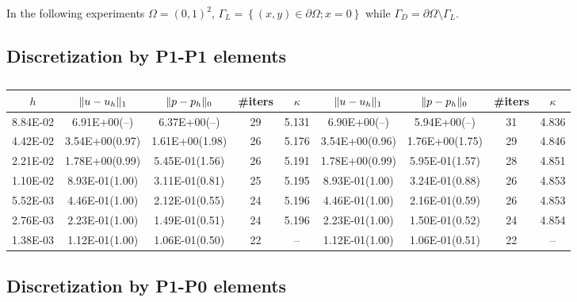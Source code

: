 \documentclass[r]{siamart171218}
\begin{document}
In the following experiments $\Omega=(0, 1)^2$, $\Gamma_L=\left\{(x, y)\in\partial\Omega; x=0\right\}$
while $\Gamma_D=\partial\Omega\setminus \Gamma_L$.

\subsection{Discretization by P1-P1 elements}\label{sec:p1_p1}

\begin{table}
  \begin{center}
    \footnotesize{
  \begin{tabular}{c|cc|c|c||cc|c|c}
    \hline
    $h$ & $\lVert{u-u_h}\rVert_1$ & $\lVert{p-p_h}\rVert_0$ & \#{iters} & $\kappa$
        & $\lVert{u-u_h}\rVert_1$ & $\lVert{p-p_h}\rVert_0$ & \#{iters} & $\kappa$ \\
    \hline
8.84E-02 & 6.91E+00(--)   & 6.37E+00(--)   & 29 & 5.131 & 6.90E+00(--)  & 5.94E+00(--)    & 31 & 4.836\\
4.42E-02 & 3.54E+00(0.97) & 1.61E+00(1.98) & 26 & 5.176 & 3.54E+00(0.96) & 1.76E+00(1.75) & 29 & 4.846\\
2.21E-02 & 1.78E+00(0.99) & 5.45E-01(1.56) & 26 & 5.191 & 1.78E+00(0.99) & 5.95E-01(1.57) & 28 & 4.851\\
1.10E-02 & 8.93E-01(1.00) & 3.11E-01(0.81) & 25 & 5.195 & 8.93E-01(1.00) & 3.24E-01(0.88) & 26 & 4.853\\
5.52E-03 & 4.46E-01(1.00) & 2.12E-01(0.55) & 24 & 5.196 & 4.46E-01(1.00) & 2.16E-01(0.59) & 26 & 4.853\\
2.76E-03 & 2.23E-01(1.00) & 1.49E-01(0.51) & 24 & 5.196 & 2.23E-01(1.00) & 1.50E-01(0.52) & 24 & 4.854\\
1.38E-03 & 1.12E-01(1.00) & 1.06E-01(0.50) & 22 & --    & 1.12E-01(1.00) & 1.06E-01(0.51) & 22 & --   \\
    \hline
  \end{tabular}
  }
  \caption{}
  \label{tab:p1_p1}
  \end{center}
\end{table}

\subsection{Discretization by P1-P0 elements}\label{sec:p1_p0}
\end{document}
